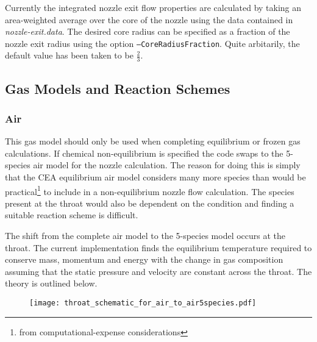 Currently the integrated nozzle exit flow properties are calculated by taking an area-weighted average over the core of the nozzle using the data contained in \textit{nozzle-exit.data}. The desired core radius can be specified as a fraction of the nozzle exit radius using the option \texttt{--CoreRadiusFraction}. Quite arbitarily, the default value has been taken to be $\frac{2}{3}$.

\subsection{Gas Models and Reaction Schemes}
\label{gas_models}

\subsubsection{Air}
This gas model should only be used when completing equilibrium or frozen gas calculations. If chemical non-equilibrium is specified the code swaps to the 5-species air model for the nozzle calculation. The reason for doing this is simply that the CEA equilibrium air model considers many more species than would be practical\footnote{from computational-expense considerations} to include in a non-equilibrium nozzle flow calculation. The species present at the throat would also be dependent on the condition and finding a suitable reaction scheme is difficult.

The shift from the complete air model to the 5-species model occurs at the throat. The current implementation finds the equilibrium temperature required to conserve mass, momentum and energy with the change in gas composition assuming that the static pressure and velocity are constant across the throat. The theory is outlined below.

\begin{figure}[ht!]%
\centering
\texttt{[image: throat\_schematic\_for\_air\_to\_air5species.pdf]}%
\caption{}%
\label{throat_schematic}%
\end{figure}

